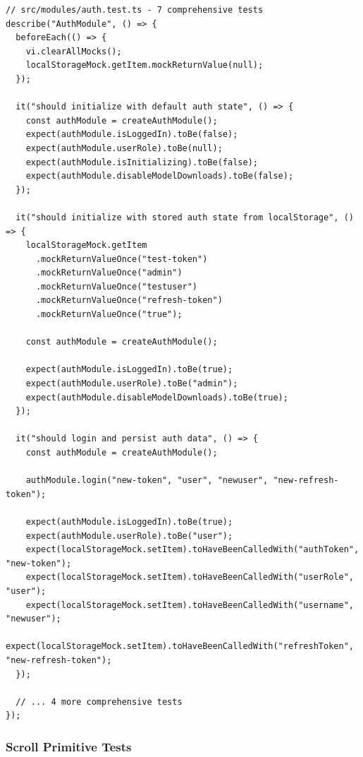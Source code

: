 \documentclass[11pt]{article}
\begin{document}
\begin{lstlisting}[style=typescript]
// src/modules/auth.test.ts - 7 comprehensive tests
describe("AuthModule", () => {
  beforeEach(() => {
    vi.clearAllMocks();
    localStorageMock.getItem.mockReturnValue(null);
  });

  it("should initialize with default auth state", () => {
    const authModule = createAuthModule();
    expect(authModule.isLoggedIn).toBe(false);
    expect(authModule.userRole).toBe(null);
    expect(authModule.isInitializing).toBe(false);
    expect(authModule.disableModelDownloads).toBe(false);
  });

  it("should initialize with stored auth state from localStorage", () => {
    localStorageMock.getItem
      .mockReturnValueOnce("test-token")
      .mockReturnValueOnce("admin")
      .mockReturnValueOnce("testuser")
      .mockReturnValueOnce("refresh-token")
      .mockReturnValueOnce("true");

    const authModule = createAuthModule();
    
    expect(authModule.isLoggedIn).toBe(true);
    expect(authModule.userRole).toBe("admin");
    expect(authModule.disableModelDownloads).toBe(true);
  });

  it("should login and persist auth data", () => {
    const authModule = createAuthModule();
    
    authModule.login("new-token", "user", "newuser", "new-refresh-token");
    
    expect(authModule.isLoggedIn).toBe(true);
    expect(authModule.userRole).toBe("user");
    expect(localStorageMock.setItem).toHaveBeenCalledWith("authToken", "new-token");
    expect(localStorageMock.setItem).toHaveBeenCalledWith("userRole", "user");
    expect(localStorageMock.setItem).toHaveBeenCalledWith("username", "newuser");
    expect(localStorageMock.setItem).toHaveBeenCalledWith("refreshToken", "new-refresh-token");
  });

  // ... 4 more comprehensive tests
});
\end{lstlisting}

\subsubsection{Scroll Primitive Tests}
\end{document}
